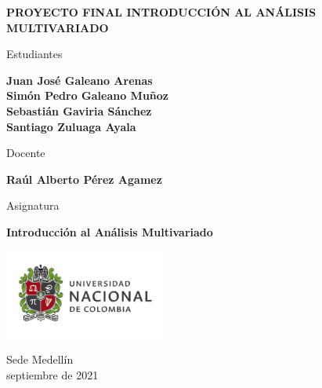 \begin{titlepage}
   \Large{
   \begin{center}
       \vspace*{1cm}

       \textbf{PROYECTO FINAL INTRODUCCIÓN AL ANÁLISIS MULTIVARIADO}

            
       \vspace{1cm}
       
       Estudiantes
       
       \vspace{0.5cm}
        
        
       \textbf{Juan José Galeano Arenas} \\
       \textbf{Simón Pedro Galeano Muñoz} \\
       \textbf{Sebastián Gaviria Sánchez} \\
       \textbf{Santiago Zuluaga Ayala} \\
       
              \vspace{1cm}
       
       Docente
       
       \vspace{0.5cm}

       \textbf{Raúl Alberto Pérez Agamez}
       
       \vspace{0.4cm}

       \vspace{1.5cm}
       
       Asignatura
       
       \vspace{0.5cm}

       \textbf{Introducción al Análisis Multivariado}

       \vfill

            
       \vspace{0.1cm}
     
       \includegraphics[width=0.4\textwidth]{logounal.png}
            
       Sede Medellín\\
       septiembre de 2021
       
   \end{center}
   }
\end{titlepage}